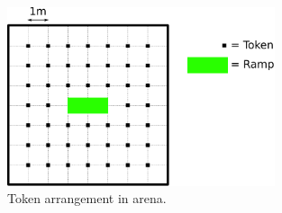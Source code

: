 \begin{figure}
  \begin{center}
    \includegraphics[keepaspectratio,width=0.7\textwidth]{./images/token-layout.pdf}
  \end{center}
  \caption{\label{fig:token-arrangement}Token arrangement in arena.}
\end{figure}
